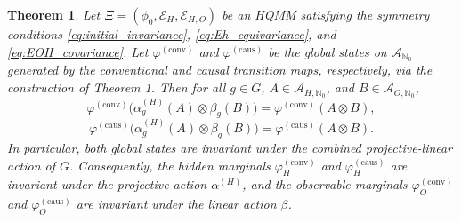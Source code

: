\documentclass[12pt,a4paper]{article}
\newtheorem{theorem}{Theorem}[section]
\begin{document}
\begin{theorem}\label{thm:global_invariance}
Let \(\Xi = (\phi_0, \mathcal{E}_H, \mathcal{E}_{H,O})\) be an HQMM satisfying the symmetry conditions \eqref{eq:initial_invariance}, \eqref{eq:Eh_equivariance}, and \eqref{eq:EOH_covariance}. Let \(\varphi^{(\text{conv})}\) and \(\varphi^{(\text{caus})}\) be the global states on \(\mathcal{A}_{\mathbb{N}_0}\) generated by the conventional and causal transition maps, respectively, via the construction of Theorem 1. Then for all \(g \in G\), \(A \in \mathcal{A}_{H,\mathbb{N}_0}\), and \(B \in \mathcal{A}_{O,\mathbb{N}_0}\),
\begin{equation}
\varphi^{(\text{conv})}\big( \alpha_g^{(H)}(A) \otimes \beta_g(B) \big) = \varphi^{(\text{conv})}(A \otimes B),
\label{eq:global_conv_invariance}
\end{equation}
\begin{equation}
\varphi^{(\text{caus})}\big( \alpha_g^{(H)}(A) \otimes \beta_g(B) \big) = \varphi^{(\text{caus})}(A \otimes B).
\label{eq:global_caus_invariance}
\end{equation}
In particular, both global states are invariant under the combined projective-linear action of \(G\). Consequently, the hidden marginals \(\varphi_H^{(\text{conv})}\) and \(\varphi_H^{(\text{caus})}\) are invariant under the projective action \(\alpha^{(H)}\), and the observable marginals \(\varphi_O^{(\text{conv})}\) and \(\varphi_O^{(\text{caus})}\) are invariant under the linear action \(\beta\).
\end{theorem}
\end{document}
